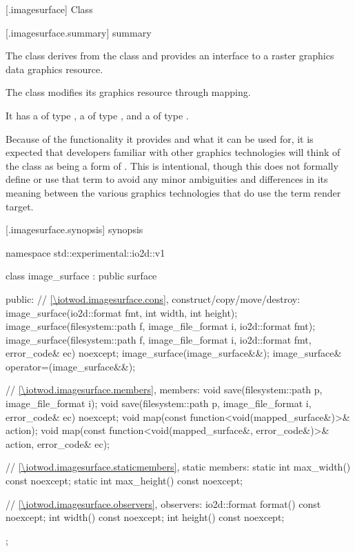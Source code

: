  [\iotwod.imagesurface] {Class }

 [\iotwod.imagesurface.summary] { summary}

\pnum
{}%
The class  derives from the  class and provides an interface to a raster graphics data graphics resource.

\pnum
The  class modifies its graphics resource through mapping.

\pnum
It has a  of type , a  of type , and a  of type .

\pnum
\begin{note}
Because of the functionality it provides and what it can be used for, it is expected that developers familiar with other graphics technologies will think of the  class as being a form of . This is intentional, though this \documenttypename{} does not formally define or use that term to avoid any minor ambiguities and differences in its meaning between the various graphics technologies that do use the term render target.
\end{note}

 [\iotwod.imagesurface.synopsis] { synopsis}

\begin{codeblock}
namespace std::experimental::io2d::v1 {
  class image_surface : public surface {
  public:
    // \ref{\iotwod.imagesurface.cons}, construct/copy/move/destroy:
    image_surface(io2d::format fmt, int width, int height);
    image_surface(filesystem::path f, image_file_format i, 
      io2d::format fmt);
    image_surface(filesystem::path f, image_file_format i, 
      io2d::format fmt, error_code& ec) noexcept;
    image_surface(image_surface&&);
    image_surface& operator=(image_surface&&);
    
    // \ref{\iotwod.imagesurface.members}, members:
    void save(filesystem::path p, image_file_format i);
    void save(filesystem::path p, image_file_format i, error_code& ec) noexcept;
    void map(const function<void(mapped_surface&)>& action);
    void map(const function<void(mapped_surface&, error_code&)>& action,
      error_code& ec);
    
    // \ref{\iotwod.imagesurface.staticmembers}, static members:
    static int max_width() const noexcept;
    static int max_height() const noexcept;
    
    // \ref{\iotwod.imagesurface.observers}, observers:
    io2d::format format() const noexcept;
    int width() const noexcept;
    int height() const noexcept;
  };
}
\end{codeblock}


